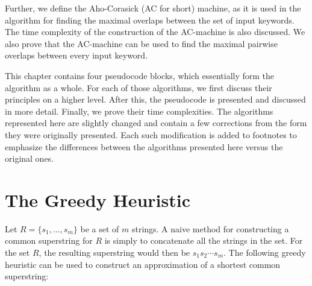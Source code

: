 \documentclass[english,twoside,censored,csm,algorithms-track-2020]{HYthesisML}
\theoremstyle{plain}
\theoremstyle{definition}
\begin{document}
Further, we define the Aho-Corasick (AC for short) machine, as it is used in the algorithm for finding
the maximal overlaps between the set of input keywords. The time complexity of the construction of
the AC-machine is also discussed. We also prove that the AC-machine can be used to find the maximal
pairwise overlaps between every input keyword.

This chapter contains four pseudocode blocks, which essentially form the algorithm as a whole.
For each of those algorithms, we first discuss their principles on a higher level. After this,
the pseudocode
is presented and discussed in more detail. Finally, we prove their time complexities.
The algorithms represented here are slightly changed and contain a few corrections from the form they
were originally presented. Each such modification is added to footnotes to emphasize the differences between
the algorithms presented here versus the original ones.



\section{The Greedy Heuristic}

  

Let $R=\{s_1,...,s_m\}$ be a set of $m$ strings. A naive method for constructing a common superstring
for $R$ is simply to concatenate all the strings in the set. For the set $R$, the resulting superstring
would then be $s_1s_2\cdots s_m$.
The following greedy heuristic can be used to construct an approximation of a shortest
common superstring:
\end{document}
